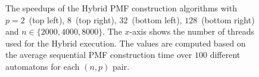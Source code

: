 \documentclass[12pt]{article}
\begin{document}
\begin{figure}[ht]
	\centering
	\caption{The speedups of the Hybrid PMF construction algorithms with $p = 2$~(top left), $8$~(top right), $32$~(bottom left), $128$~(bottom right) and $n \in \{2000, 4000, 8000\}$. The $x$-axis shows the number of threads used for the Hybrid execution.  The values are computed based on the average sequential PMF construction time over $100$ different automatons for each $(n, p)$ pair.}
	\label{fig:hybrid-speedup}
\end{figure}
\end{document}
